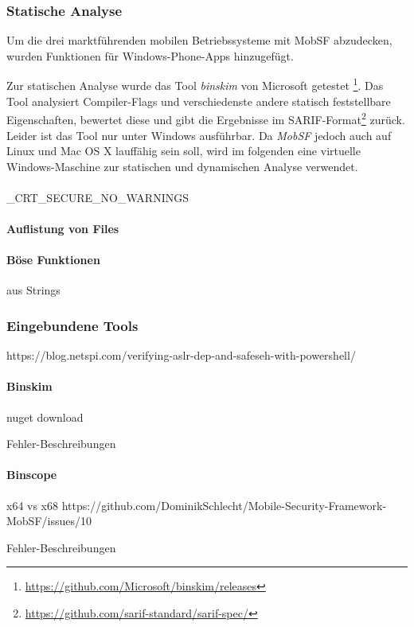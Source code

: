 \subsubsection{Statische Analyse}
Um die drei marktführenden mobilen Betriebssysteme mit MobSF abzudecken, wurden Funktionen für Windows-Phone-Apps hinzugefügt.

Zur statischen Analyse wurde das Tool \textit{binskim} von Microsoft getestet \footnote{\url{https://github.com/Microsoft/binskim/releases}}. Das Tool analysiert Compiler-Flags und verschiedenste andere statisch feststellbare Eigenschaften, bewertet diese und gibt die Ergebnisse im SARIF-Format\footnote{\url{https://github.com/sarif-standard/sarif-spec/}} zurück. Leider ist das Tool nur unter Windows ausführbar. Da \textit{MobSF} jedoch auch auf Linux und Mac OS X lauffähig sein soll, wird im folgenden eine virtuelle Windows-Maschine zur statischen und dynamischen Analyse verwendet.
\\\\
\_CRT\_SECURE\_NO\_WARNINGS

\paragraph{Auflistung von Files}

\paragraph{Böse Funktionen}
aus Strings

\subsubsection{Eingebundene Tools}

https://blog.netspi.com/verifying-aslr-dep-and-safeseh-with-powershell/

\paragraph{Binskim}
nuget download

Fehler-Beschreibungen

\paragraph{Binscope}
x64 vs x68
https://github.com/DominikSchlecht/Mobile-Security-Framework-MobSF/issues/10

Fehler-Beschreibungen

